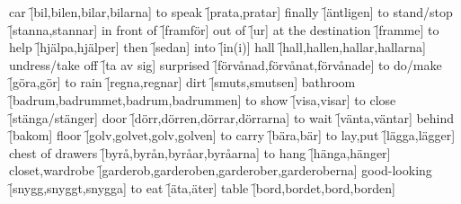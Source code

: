 \begin{questions}
    \begin{multicols}{2}
        \raggedcolumns
        \question car \f[bil,bilen,bilar,bilarna]
        \question to speak \f[prata,pratar]
        \question finally \f[äntligen]
        \question to stand/stop \f[stanna,stannar]
        \question in front of \f[framför]
        \question out of \f[ur]
        \question at the destination \f[framme]
        \question to help \f[hjälpa,hjälper]
        \question then \f[sedan]
        \question into \f[in(i)]
        \question hall \f[hall,hallen,hallar,hallarna]
        \question undress/take off \f[ta av sig]
        \question surprised \f[förvånad,förvånat,förvånade]
        \question to do/make \f[göra,gör]
        \question to rain \f[regna,regnar]
        \question dirt \f[smuts,smutsen]
        \question bathroom \f[badrum,badrummet,badrum,badrummen]
        \question to show \f[visa,visar]
        \question to close \f[stänga/stänger]
        \question door \f[dörr,dörren,dörrar,dörrarna]
        \question to wait \f[vänta,väntar]
        \question behind \f[bakom]
        \question floor \f[golv,golvet,golv,golven]
        \question to carry \f[bära,bär]
        \question to lay,put \f[lägga,lägger]
        \question chest of drawers \f[byrå,byrån,byråar,byråarna]
        \question to hang \f[hänga,hänger]
        \question closet,wardrobe \f[garderob,garderoben,garderober,garderoberna]
        \question good-looking \f[snygg,snyggt,snygga]
        \question to eat \f[äta,äter]
        \question table \f[bord,bordet,bord,borden]
    \end{multicols}
\end{questions}